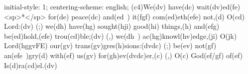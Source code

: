 initial-style: 1;
centering-scheme: english;
(c4)We(dv) have(dc) wait(dv)ed(fe) <sp>*</sp> for(de) peace(dc) and(ed~) it(fgf) com(ed)eth(efe) not,(d) O(cd) Lord:(dv) (;) we(dh) have(hg) sought(hji) good(hi) things,(h) and(efg) be(ed)hold,(efe) trou(cd)ble;(dv) (,) we(dh~) ac(hg)knowl(hv)edge,(ji) O(jk) Lord(hggvFE) our(gv) trans(gv)gres(h)sions:(dvdc) (;) be(ev) not(gf) an(efe~)gry(d) with(ef) us(gv) for(gh)ev(dvdc)er,(c) (,) O(c) God(ef/gf) of(ef) Is(d)ra(cd)el.(dv)
